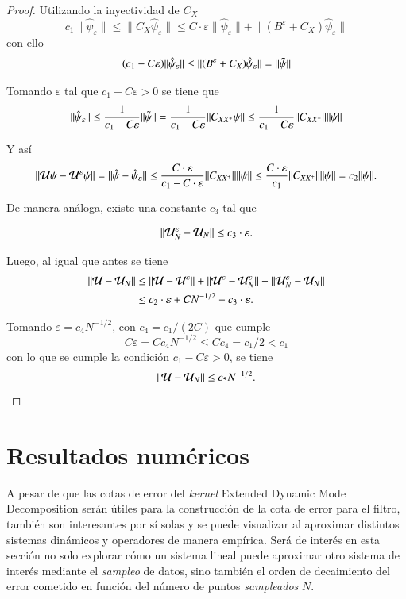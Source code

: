 \begin{proof}
    Utilizando la inyectividad de $C_X$
    \[
    c_1 \|\hat{\psi}_\varepsilon\| \leq \| C_X \hat{\psi}_\varepsilon \| \leq  C \cdot \varepsilon  \| \hat{\psi}_\varepsilon \| + \| (B^\varepsilon + C_X)\hat{\psi}_\varepsilon\|
    \]
    con ello
    \[
    (c_1 - C\varepsilon)  \|\hat{\psi}_\varepsilon\| \leq \| (B^\varepsilon + C_X)\hat{\psi}_\varepsilon\| = \| \Tilde{\psi} \|
    \]
    
    Tomando $\varepsilon$ tal que $c_1 - C \varepsilon > 0$ se tiene que
    \[
    \|\hat{\psi}_\varepsilon\| \leq \frac{1}{c_1 - C\varepsilon} \| \Tilde{\psi} \| = \frac{1}{c_1 - C\varepsilon} \| C_{XX^+} \psi \| \leq \frac{1}{c_1 - C\varepsilon} \| C_{XX^+} \| \| \psi \|
    \]

     Y así
    \[
     \| \mathcal{U}\psi - \mathcal{U}^\varepsilon\psi \| = \| \hat{\psi} - \hat{\psi}_\varepsilon \| \leq \frac{C \cdot \varepsilon}{c_1 - C \cdot \varepsilon} \| C_{XX^+} \| \| \psi \| \leq \frac{C \cdot \varepsilon}{c_1} \| C_{XX^+} \| \| \psi \| = c_2 \| \psi \|.
    \]

    De manera análoga, existe una constante $c_3$ tal que 

    \[
    \| \mathcal{U}^\varepsilon_N - \mathcal{U}_N \| \leq c_3 \cdot \varepsilon.
    \]
    
    Luego, al igual que antes se tiene
    \[
    \begin{aligned}
        \| \mathcal{U} - \mathcal{U}_N \| & \leq \| \mathcal{U} - \mathcal{U}^\varepsilon \| + \| \mathcal{U}^\varepsilon - \mathcal{U}_N^\varepsilon \| + \| \mathcal{U}_N^\varepsilon - \mathcal{U}_N \| \\
        & \leq c_2 \cdot \varepsilon + C N^{-1/2} + c_3 \cdot \varepsilon.
    \end{aligned}
    \]

   Tomando $\varepsilon = c_4 N^{-1/2}$, con $c_4 = c_1/(2C)$ que cumple
   \[
   C  \varepsilon = C c_4 N^{-1/2} \leq C c_4 = c_1/2 < c_1
   \]
   con lo que se cumple la condición $c_1 - C  \varepsilon > 0$, se tiene
   \[
   \| \mathcal{U} - \mathcal{U}_N \| \leq c_5 N^{-1/2}.
   \]
\end{proof}

\section{Resultados numéricos}

A pesar de que las cotas de error del \textit{kernel} Extended Dynamic Mode Decomposition serán útiles para la construcción de la cota de error para el filtro, también son interesantes por sí solas y se puede visualizar al aproximar distintos sistemas dinámicos y operadores de manera empírica.
Será de interés en esta sección no solo explorar cómo un sistema lineal puede aproximar otro sistema de interés mediante el \textit{sampleo} de datos, sino también el orden de decaimiento del error cometido en función del número de puntos \textit{sampleados} $N$.

